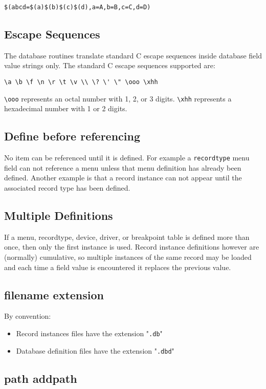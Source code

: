 \begin{verbatim}$(abcd=$(a)$(b)$(c)$(d),a=A,b=B,c=C,d=D)
\end{verbatim}\subsection{Escape Sequences}

The database routines translate standard C escape sequences inside database field value strings only. The standard C 
escape sequences supported are:

\begin{verbatim}\a \b \f \n \r \t \v \\ \? \' \" \ooo \xhh
\end{verbatim}\verb|\ooo| represents an octal number with 1, 2, or 3 digits. \verb|\xhh| represents a hexadecimal number with 1 or 2 digits.

\subsection{Define before referencing}

No item can be referenced until it is defined. For example a \verb|recordtype| menu field can not reference a menu unless 
that menu definition has already been defined. Another example is that a record instance can not appear until the 
associated record type has been defined.

\subsection{Multiple Definitions}

If a menu, recordtype, device, driver, or breakpoint table is defined more than once, then only the first instance is used. 
Record instance definitions however are (normally) cumulative, so multiple instances of the same record may be loaded 
and each time a field value is encountered it replaces the previous value.

\subsection{filename extension}

By convention:

\begin{itemize}\item Record instances files have the extension "\verb|.db|"

\item Database definition files have the extension "\verb|.dbd|"

\end{itemize}\subsection{path addpath}

